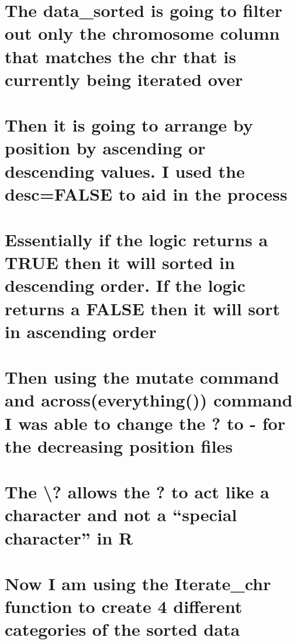 \documentclass[
]{article}
\begin{document}
\section{The data\_sorted is going to filter out only the chromosome
column that matches the chr that is currently being iterated
over}\label{the-data_sorted-is-going-to-filter-out-only-the-chromosome-column-that-matches-the-chr-that-is-currently-being-iterated-over}

\section{Then it is going to arrange by position by ascending or
descending values. I used the desc=FALSE to aid in the
process}\label{then-it-is-going-to-arrange-by-position-by-ascending-or-descending-values.-i-used-the-descfalse-to-aid-in-the-process}

\section{Essentially if the logic returns a TRUE then it will sorted in
descending order. If the logic returns a FALSE then it will sort in
ascending
order}\label{essentially-if-the-logic-returns-a-true-then-it-will-sorted-in-descending-order.-if-the-logic-returns-a-false-then-it-will-sort-in-ascending-order}

\section{Then using the mutate command and across(everything()) command
I was able to change the ? to - for the decreasing position
files}\label{then-using-the-mutate-command-and-acrosseverything-command-i-was-able-to-change-the-to---for-the-decreasing-position-files}

\section{The \textbackslash? allows the ? to act like a character and
not a ``special character'' in
R}\label{the-allows-the-to-act-like-a-character-and-not-a-special-character-in-r}

\section{Now I am using the Iterate\_chr function to create 4 different
categories of the sorted
data}\label{now-i-am-using-the-iterate_chr-function-to-create-4-different-categories-of-the-sorted-data}
\end{document}
